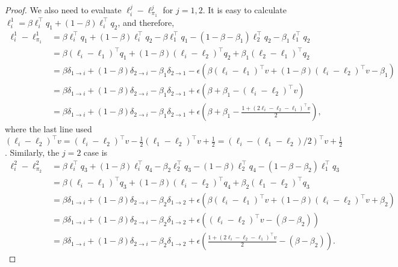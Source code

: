 \documentclass{article}
\begin{document}
\begin{proof}
We also need to evaluate $\ell_i^j - \ell_{\pi_1}^j$ for $j=1,2$. It is easy to calculate $\ell_i^1 = \beta \ell_i^\top q_1 + (1-\beta)\ell_i^\top q_2$, and therefore,
\begin{align*}
    \ell_i^1 - \ell_{\pi_1}^1
  &=
    \beta \ell_i^\top q_1 + (1-\beta)\ell_i^\top q_2 - \beta\ell_1^\top q_1
    - (1-\beta - \beta_1)\ell_2^\top q_2- \beta_1 \ell_1^\top q_2\\
  &=
    \beta (\ell_i - \ell_1)^\top q_1 + (1-\beta)(\ell_i - \ell_2)^\top q_2
    + \beta_1( \ell_2-\ell_1)^\top q_2\\
  &=
    \beta \delta_{1\rightarrow i}
    + (1-\beta)\delta_{2 \rightarrow i}
    - \beta_1 \delta_{2\rightarrow 1}
    -\epsilon \left(
    \beta (\ell_i - \ell_1)^\top v  
    +(1-\beta)(\ell_i - \ell_2)^\top v
    -\beta_1 \right)\\
  &=
    \beta \delta_{1\rightarrow i}+ (1-\beta)\delta_{2 \rightarrow i} - \beta_1 \delta_{2\rightarrow 1}
    +\epsilon\left(\beta+\beta_1
    -(\ell_i - \ell_2)^\top v\right)\\
    &=
    \beta \delta_{1\rightarrow i}+ (1-\beta)\delta_{2 \rightarrow i} - \beta_1 \delta_{2\rightarrow 1}
    +\epsilon\left(\beta+\beta_1
    -\frac{1+\left(2\ell_i - \ell_2-\ell_1\right)^\top v}{2}\right),
\end{align*}
where the last line used $(\ell_i - \ell_2)^\top v = (\ell_i - \ell_2)^\top v - \frac12(\ell_1 - \ell_2)^\top v+ \frac12 = (\ell_i - (\ell_1 - \ell_2)/2)^\top v + \frac12$.
Similarly, the $j=2$ case is
\begin{align*}
    \ell_i^2 - \ell_{\pi_2}^2
  &=
    \beta \ell_i^\top q_3 + (1-\beta)\ell_i^\top q_4 - \beta_2\ell_2^\top q_3
    - (1-\beta)\ell_2^\top q_4- (1-\beta -\beta_2) \ell_1^\top q_3\\
  &=
    \beta (\ell_i - \ell_1)^\top q_3 + (1-\beta)(\ell_i - \ell_2)^\top q_4
    + \beta_2( \ell_1 - \ell_2)^\top q_3\\
  &=
    \beta \delta_{1\rightarrow i}
    + (1-\beta)\delta_{2\rightarrow i}
    - \beta_2 \delta_{1\rightarrow 2}
    + \epsilon\left(\beta (\ell_i - \ell_1)^\top v + (1-\beta)(\ell_i - \ell_2)^\top v + \beta_2\right)\\
    &=
    \beta \delta_{1\rightarrow i}
    + (1-\beta)\delta_{2\rightarrow i}
      - \beta_2 \delta_{1\rightarrow 2}
      +\epsilon\left(      
       (\ell_i - \ell_2)^\top v  - (\beta-\beta_2)
      \right)\\
  &=
    \beta \delta_{1\rightarrow i}
    + (1-\beta)\delta_{2\rightarrow i}
      - \beta_2 \delta_{1\rightarrow 2}
      +\epsilon\left(         
    \frac{1+\left(2\ell_i - \ell_2-\ell_1\right)^\top v}{2}
    - (\beta-\beta_2)
      \right).
\end{align*}


\end{proof}
\end{document}
